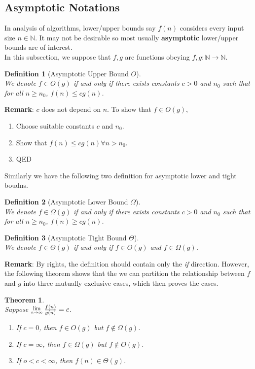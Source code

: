 \documentclass[12pt]{article}
\newcommand{\Lim}[1]{\raisebox{0.5ex}{\scalebox{0.8}{$\displaystyle \lim_{#1}\;$}}}
\newtheorem{definition}{Definition}[section]
\newtheorem{theorem}{Theorem}[section]
\theoremstyle{definition}
\newcommand{\T}{\Theta}
\newcommand{\Omg}{\Omega}
\begin{document}
\subsection{Asymptotic Notations}
In analysis of algorithms, lower/upper bounds say $f(n)$ considers every input size $n\in\mathbb{N}$. It may not be desirable so most usually \textbf{asymptotic} lower/upper bounds are of interest.\\
In this subsection, we suppose that $f, g$ are functions obeying $f,g:\mathbb{N}\to\mathbb{N}$.
\begin{definition}[Asymptotic Upper Bound {$O$}]
\hfill\\\normalfont We denote $f\in O(g)$ \textit{if and only if} there exists constants $c>0$ and $n_0$ such that for all $n\geq n_0$, $f(n)\leq cg(n)$.
\end{definition}
\textbf{Remark}: $c$ does not depend on $n$.
To show that $f\in O(g)$,
\begin{enumerate}
  \item Choose suitable constants $c$ and $n_0$. 
  \item Show that $f(n)\leq cg(n) \forall n>n_0$.
  \item QED
\end{enumerate}
Similarly we have the following two definition for asymptotic lower and tight boudns.
\begin{definition}[Asymptotic Lower Bound {$\Omg$}]
\hfill\\\normalfont We denote $f\in\Omg(g)$ \textit{if and only if} there exists constants $c>0$ and $n_0$ such that for all $n\geq n_0$, $f(n)\geq cg(n)$.
\end{definition}
\begin{definition}[Asymptotic Tight Bound {$\T$}]
\hfill\\\normalfont We denote $f\in\T(g)$ if and only if $f\in O(g)$ and $f\in\Omg(g)$.
\end{definition}
\textbf{Remark}: By rights, the definition should contain only the \textit{if} direction. However, the following theorem shows that the we can partition the relationship between $f$ and $g$ into three mutually exclusive cases, which then proves the  cases.
\begin{theorem}
\hfill\\\normalfont Suppose $\Lim{n\to\infty}\frac{f(n)}{g(n)}=c$.
\begin{enumerate}[label=(\arabic*)]
  \item If $c=0$, then $f\in O(g)$ but $f\not\in\Omg(g)$.
  \item If $c=\infty$, then $f\in\Omg(g)$ but $f\not\in O(g)$.
  \item If $o<c<\infty$, then $f(n)\in\T(g)$.
\end{enumerate}
\end{theorem}
\end{document}
